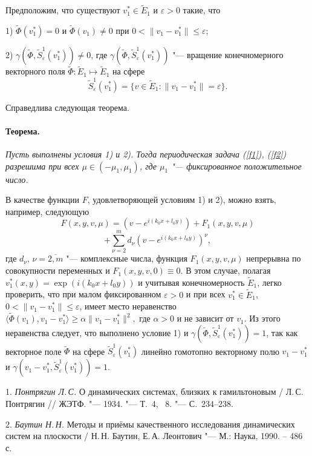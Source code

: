 Предположим, что существуют $v_1^*\in \widetilde{E}_1$ и
$\varepsilon>0$ такие, что

1) $\widetilde{\Phi}(v_1^*)=0$ и $\widetilde{\Phi}(v_1)\neq 0$ при
$0<\|v_1-v_1^*\|\leq\varepsilon$;

2)
$\gamma(\widetilde{\Phi},\widetilde{S}_{\varepsilon}^1(v_1^*))\neq
0$, где
$\gamma(\widetilde{\Phi},\widetilde{S}_{\varepsilon}^1(v_1^*))$ "---
вращение конечномерного векторного поля $\widetilde{\Phi} :
\widetilde{E}_1 \mapsto \widetilde{E}_1$ на сфере
$$
 \widetilde{S}_{\varepsilon}^1(v_1^*)= \{v\in \widetilde{E}_1
: \|v_1-v_1^*\|=\varepsilon\}.
$$

Справедлива следующая теорема.

\paragraph{Теорема.}
{\it
	Пусть выполнены условия 1) и 2). Тогда  периодическая задача
(\ref{f1}), (\ref{f2}) разрешима при всех $\mu\in (-\mu_1 ,
\mu_1)$, где $\mu_1$ "--- фиксированное положительное число.
}

В качестве функции $F$, удовлетворяющей условиям 1) и 2),
 можно взять, например, следующую
$$
F(x,y,v,\mu)=\left(v-e^{i(k_0x+l_0y)}\right)+ F_1(x,y,v,\mu)
$$
$$
+\sum_{\nu=2}^m
d_{\nu}\left(v-e^{i(k_0x+l_0y)} \right)^{\nu} ,
$$
где $d_{\nu}$, $\nu=\overline{2, m}$ "--- комплексные числа, функция
$F_1(x,y,v,\mu)$ непрерывна по совокупности переменных и
$F_1(x,y,v,0)\equiv 0$. В этом случае, полагая
$v_1^*(x,y)=\exp{(i(k_0x+l_0y))}$ и учитывая конечномерность
$\widetilde{E}_1$, легко проверить, что при малом фиксированном
$\varepsilon>0$ и при всех $v_1^*\in \widetilde{E}_1$,
$0<\|v_1-v_1^*\|\leq\varepsilon$, имеет место неравенство
$
\langle\widetilde{\Phi}(v_1), v_1-v_1^*\rangle  \geq  \alpha
\|v_1-v_1^*\|^2,
$
где $\alpha>0$ и не зависит от $v_1$. Из этого неравенства
следует, что выполнено условие 1) и
$\gamma(\widetilde{\Phi},\widetilde{S}_{\varepsilon}^1(v_1^*))=1$,
так как  векторное поле $\widetilde{\Phi}$ на сфере
$\widetilde{S}_{\varepsilon}^1(v_1^*)$ линейно гомотопно
векторному полю $v_1-v_1^*$ и
$\gamma(v_1-v_1^*,\widetilde{S}_{\varepsilon}^1(v_1^*))=1$.


\litlist

1. {\it Понтрягин Л.\,С.}
О динамических системах, близких к гамильтоновым  / Л.\,С.
Понтрягин // ЖЭТФ. "--- 1934. "--- Т.~4, \No~8. "--- С.~234--238.

2. {\it Баутин Н.\,Н. }
Методы и приёмы качественного исследования динамических систем на
плоскости / Н.\,Н. Баутин, Е.\,А. Леонтович "--- М.: Наука, 1990.
-- 486 с.

